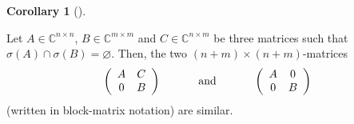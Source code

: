 \documentclass[numbers=enddot,12pt,final,onecolumn,notitlepage]{scrartcl}%
\numberwithin{exer}{subsection}
\theoremstyle{definition}
\newtheorem{coro}[theo]{Corollary}
\newenvironment{corollary}[1][]
{\begin{coro}[#1]\begin{leftbar}}
{\end{leftbar}\end{coro}}
\begin{document}
\begin{corollary}
Let $A\in\mathbb{C}^{n\times n}$, $B\in\mathbb{C}^{m\times m}$ and
$C\in\mathbb{C}^{n\times m}$ be three matrices such that $\sigma\left(
A\right)  \cap\sigma\left(  B\right)  =\varnothing$. Then, the two $\left(
n+m\right)  \times\left(  n+m\right)  $-matrices%
\[
\left(
\begin{array}
[c]{cc}%
A & C\\
0 & B
\end{array}
\right)  \ \ \ \ \ \ \ \ \ \ \text{and}\ \ \ \ \ \ \ \ \ \ \left(
\begin{array}
[c]{cc}%
A & 0\\
0 & B
\end{array}
\right)
\]
(written in block-matrix notation) are similar.
\end{corollary}
\end{document}
